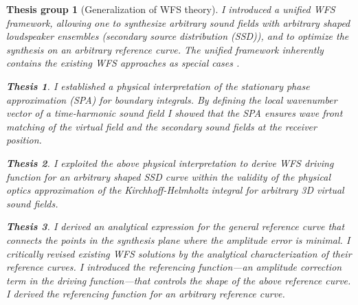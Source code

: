 \documentclass[10pt,twoside]{article}
\theoremstyle{thesisgroupstyle}
\newtheorem{thesisgroup}{Thesis group}
\theoremstyle{indented}
\newtheorem{thesis}{Thesis}[thesisgroup]
\begin{document}
\begin{thesisgroup}[Generalization of WFS theory]
I introduced a unified WFS framework, allowing one to synthesize arbitrary sound fields with arbitrary shaped loudspeaker ensembles (secondary source distribution (SSD)), and to optimize the synthesis on an arbitrary reference curve. 
The unified framework inherently contains the existing WFS approaches as special cases \cite{Firtha2016_booklet}.
\begin{thesis}
I established a physical interpretation of the stationary phase approximation (SPA) for boundary integrals.
By defining the local wavenumber vector of a time-harmonic sound field I showed that the SPA ensures wave front matching of the virtual field and the secondary sound fields at the receiver position.
\end{thesis}
\begin{thesis}
I exploited the above physical interpretation to derive WFS driving function for an arbitrary shaped SSD curve within the validity of the physical optics approximation of the Kirchhoff-Helmholtz integral for arbitrary 3D virtual sound fields.
\end{thesis}
\begin{thesis}
I derived an analytical expression for the general \emph{reference curve} that connects the points in the synthesis plane where the amplitude error is minimal.
I critically revised existing WFS solutions by the analytical characterization of their reference curves. 
I introduced the \emph{referencing function}---an amplitude correction term in the driving function---that controls the shape of the above reference curve.
I derived the referencing function for an arbitrary reference curve.
\end{thesis}
\end{thesisgroup}
\end{document}
